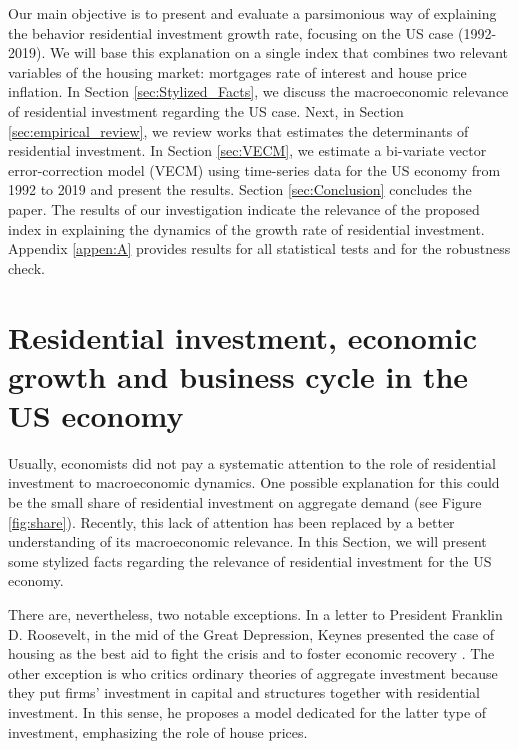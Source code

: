 \documentclass[12pt, a4paper]{article}
\begin{document}
Our main objective is to present and evaluate a parsimonious way of explaining the behavior residential investment growth rate, focusing on the US case (1992-2019).
We will base this explanation on a single index that combines two relevant variables of the housing market: mortgages rate of interest and house price inflation.
In Section \ref{sec:Stylized_Facts}, we discuss the macroeconomic relevance of residential investment regarding the US case.
Next, in Section \ref{sec:empirical_review}, we review works that estimates the determinants of residential investment.
In Section \ref{sec:VECM}, we estimate a bi-variate vector error-correction model (VECM) using time-series data for the US economy from 1992 to 2019 and present the results.
Section \ref{sec:Conclusion} concludes the paper.
The results of our investigation indicate the relevance of the proposed index in explaining the dynamics of the growth rate of residential investment.
Appendix \ref{appen:A} provides results for all statistical tests and for the robustness check.



\section{Residential investment, economic growth and business cycle in the US economy}
\label{sec:org6044cba}
\label{sec:Stylized_Facts}
Usually, economists did not pay a systematic attention to the role of residential investment to macroeconomic dynamics.
One possible explanation for this could be the small share of residential investment on aggregate demand (see Figure \ref{fig:share}).
Recently, this lack of attention has been replaced by a better understanding of its macroeconomic relevance.
In this Section, we will present some stylized facts regarding the relevance of residential investment for the US economy.

There are, nevertheless, two notable exceptions.
In a letter to President Franklin D. Roosevelt, in the mid of the Great Depression, Keynes presented the case of housing as the best aid to fight the crisis and to foster economic recovery \cite[p.~436]{keynes_collected_1978}.
The other exception is \textcite{duesenberry_investment_1958} who critics ordinary theories of aggregate investment because they put firms’ investment in capital and structures together with residential investment.
In this sense, he proposes a model dedicated for the latter type of investment, emphasizing the role of house prices.
\end{document}
